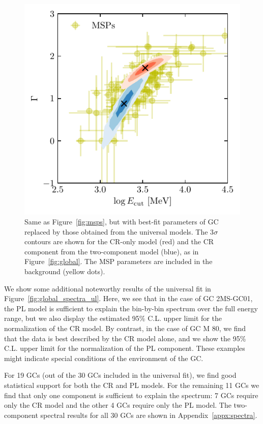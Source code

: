 \documentclass[doublespace,nopageskip]{VTthesis} %
\begin{document}
\begin{figure}
    \centering
    \includegraphics[width=\columnwidth]{Figures/Globular/msp_vs_gc_global.pdf}
    \caption{Same as Figure~\ref{fig:msps}, but with best-fit parameters of GC replaced by those obtained from the universal models. The 3$\sigma$ contours are shown for the CR-only model (red) and the CR component from the two-component model (blue), as in Figure~\ref{fig:global}. The MSP parameters are included in the background (yellow dots).}
    \label{fig:msps_global}
\end{figure}

We show some additional noteworthy results of the universal fit in Figure~\ref{fig:global_spectra_ul}. Here, we see that in the case of GC 2MS-GC01, the {PL} model is sufficient to explain the bin-by-bin spectrum over the full energy range, but we also display the estimated 95\% C.L. upper limit for the normalization of the CR model. By contrast, in the case of GC M 80, we find that the data is best described by the CR model alone, and we show the 95\% C.L. upper limit for the normalization of the {PL} component. These examples might indicate special conditions of the environment of the GC.

For 19 GCs (out of the 30 GCs included in the universal fit), we find good statistical support for both the CR and {PL} models. For the remaining 11 GCs we find that only one component is sufficient to explain the spectrum: 7 GCs require only the CR model and the other 4 GCs require only the {PL} model. The two-component spectral results for all 30 GCs are shown in Appendix~\ref{appx:spectra}.
\end{document}
